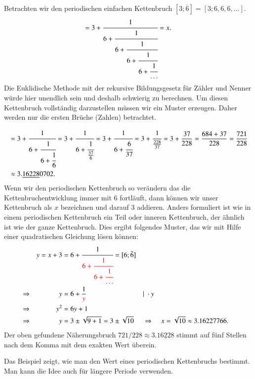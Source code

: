 \begin{beispiel}
Betrachten wir den periodischen einfachen Kettenbruch
$[3;\overline{6}] = [3;6,6,6,\dots]$.
\begin{equation}
[3;\overline{6}]
=
3 + \cfrac{1}{6+\cfrac{1}{6+\cfrac{1}{6+\cfrac{1}{6+\cfrac{1}{\dots}}}}}
=
x.
\end{equation}
Die Euklidische Methode mit der rekursive Bildungsgesetz für Zähler
und Nenner würde hier unendlich sein und deshalb schwierig zu
berechnen.
Um diesen Kettenbruch vollständig darzustellen müssen wir ein Muster
erzeugen. Daher werden nur die ersten Brüche (Zahlen) betrachtet.

\begin{align*}
[3;6,6,6]
&=
3 + \cfrac{1}{6+\cfrac{1}{6+\cfrac{1}{6}}}
=
3 + \cfrac{1}{6+\cfrac{1}{\frac{37}{6}}}
=
3 + \cfrac{1}{6+\cfrac{6}{37}}
=
3 + \cfrac{1}{\frac{228}{37}}
=
3 + \frac{37}{228}
=
\frac{684+37}{228}
=
\frac{721}{228}
\\
&\approx
3.\underline{16228}0702.
\end{align*}
Wenn wir den periodischen Kettenbruch so verändern das die
Kettenbruchentwicklung immer mit 6 fortläuft, dann können wir unser
Kettenbruch als $x$ bezeichnen und darauf 3 addieren.
Anders formuliert ist wie in einem periodischen Kettenbruch 
ein {\color{red}Teil oder inneren Kettenbruch}, der ähnlich ist wie
der ganze Kettenbruch.
Dies ergibt folgendes Muster, das wir mit Hilfe einer quadratischen
Gleichung lösen können:
\begin{align*}
&&y = x+3 &= 6 + \cfrac{1}{\color{red}6+\cfrac{1}{6+\cfrac{1}{\dots}}} = [6;\bar{6}]
\\
&\Rightarrow& y &= 6 + \frac{1}{{\color{red}y}}	&&\vert\;\cdot y
\\
&\Rightarrow& y^2 &= 6y + 1
\\
&\Rightarrow& y &= 3\pm \sqrt{9+1} = 3 \pm \sqrt{10}&&\Rightarrow& x &= \sqrt{10}
\approx
3.16227766.
\end{align*}
Der oben gefundene Näherungsbruch $721/228\approx 3.\underline{16228}$
stimmt auf fünf Stellen nach dem Komma mit dem exakten Wert überein.
\end{beispiel}

Das Beispiel zeigt, wie man den Wert eines periodischen Kettenbruchs
bestimmt.
Man kann die Idee auch für längere Periode verwenden.

